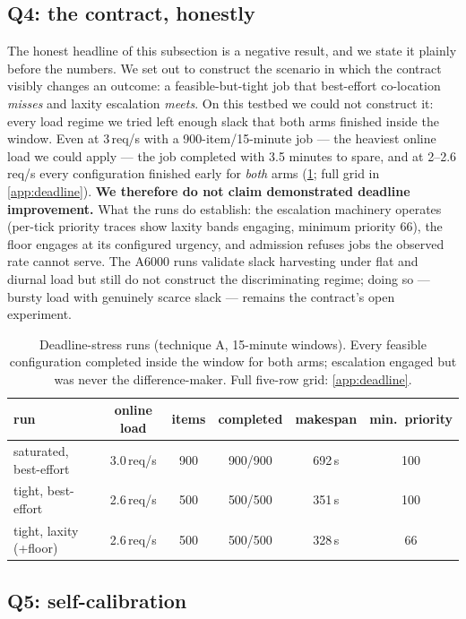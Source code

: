 \documentclass[11pt]{article}
\begin{document}
\subsection{Q4: the contract, honestly}
\label{sec:contract-eval}

The honest headline of this subsection is a negative result, and we state it plainly
before the numbers. We set out to construct the scenario in which the contract visibly
changes an outcome: a feasible-but-tight job that best-effort co-location
\emph{misses} and laxity escalation \emph{meets}. On this testbed we could not
construct it: every load regime we tried left enough slack that both arms finished
inside the window. Even at 3\,req/s with a 900-item/15-minute job --- the heaviest
online load we could apply --- the job completed with 3.5 minutes to spare, and at
2--2.6\,req/s every configuration finished early for \emph{both} arms
(\cref{tab:deadline}; full grid in \cref{app:deadline}). \textbf{We therefore do not
claim demonstrated deadline improvement.} What the runs do establish: the escalation
machinery operates (per-tick priority traces show laxity bands engaging, minimum priority
66), the floor engages at its configured urgency, and admission refuses jobs the observed
rate cannot serve. The A6000 runs validate slack harvesting under flat and diurnal load
but still do not construct the discriminating regime; doing so --- bursty load with
genuinely scarce slack --- remains the contract's open experiment.

\begin{table}[t]
\centering
\small
\caption{Deadline-stress runs (technique A, 15-minute windows). Every feasible
configuration completed inside the window for both arms; escalation engaged but was
never the difference-maker. Full five-row grid: \cref{app:deadline}.}
\label{tab:deadline}
\begin{tabular}{lccccc}
\toprule
run & online load & items & completed & makespan & min.\ priority \\
\midrule
saturated, best-effort & 3.0\,req/s & 900 & 900/900 & 692\,s & 100 \\
tight, best-effort     & 2.6\,req/s & 500 & 500/500 & 351\,s & 100 \\
tight, laxity (+floor) & 2.6\,req/s & 500 & 500/500 & 328\,s & 66 \\
\bottomrule
\end{tabular}
\end{table}

\subsection{Q5: self-calibration}
\label{sec:tech-b-eval}
\end{document}
